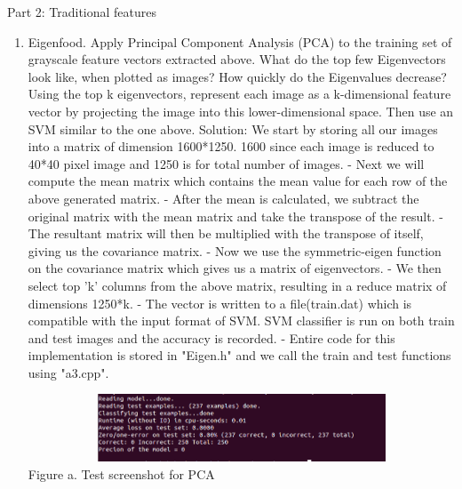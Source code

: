 \documentclass{article}
\begin{document}
	Part 2: Traditional features
	\begin{enumerate}
		\item Eigenfood. Apply Principal Component Analysis (PCA) to the training set of grayscale feature vectors extracted above. What do the top few Eigenvectors look like, when plotted as images? How quickly do the Eigenvalues decrease? 
		Using the top k eigenvectors, represent each image as a k-dimensional feature vector by projecting the image into this lower-dimensional space. Then use an SVM similar to the one above. \newline
		Solution: We start by storing all our images into a matrix of dimension 1600*1250. 1600 since each image is reduced to 40*40 pixel image and 1250 is for total number of images. \newline
		- Next we will compute the mean matrix which contains the mean value for each row of the above generated matrix. \newline
		- After the mean is calculated, we subtract the original matrix with the mean matrix and take the transpose of the result. \newline
		- The resultant matrix will then be multiplied with the transpose of itself, giving us the covariance matrix. \newline
		- Now we use the symmetric-eigen function on the covariance matrix which gives us a matrix of eigenvectors. \newline
		- We then select top 'k' columns from the above matrix, resulting in a reduce matrix of dimensions 1250*k. \newline
		- The vector is written to a file(train.dat) which is compatible with the input format of SVM. SVM classifier is run on both train and test images and the accuracy is recorded. \newline
		- Entire code for this implementation is stored in "Eigen.h" and we call the train and test functions using "a3.cpp". \newline
		\begin{center}
			\includegraphics[width=14cm, height=2cm]{test_eigen.png} \\
			Figure a. Test screenshot for PCA
		\end{center}
		

\end{enumerate}
\end{document}
